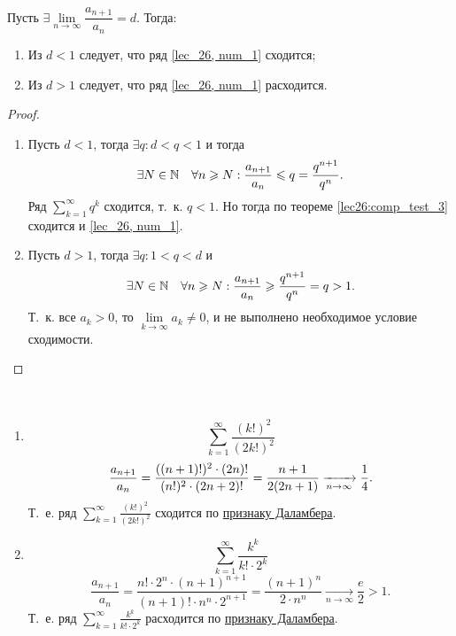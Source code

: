 \documentclass[../../main.tex]{subfiles}
\begin{document}
	\begin{thm}\label{lec27:dalamber}
		
		Пусть $\exists \lim\limits_{n \to \infty} \dfrac{a_{n+1}}{a_n} = d$. Тогда:
		\begin{enumerate}[label={\alph*)}]
		\item Из $d < 1$ следует, что ряд \eqref{lec_26, num_1} сходится;
		\item Из $d > 1$ следует, что ряд \eqref{lec_26, num_1} расходится.
		\end{enumerate}
	\end{thm}
		\begin{proof}
			
			~
			
			\begin{enumerate}[label={\alph*)}]
			\item Пусть $d < 1$, тогда $\exists q : d < q < 1$  и тогда \[\exists N \in 
			\mathbb{N} \quad
			\forall n \geqslant N:
			\frac{a_{n+1}}{a_n} \leqslant q = \frac{q^{n+1}}{q^n}.  \]
			Ряд $\sum\limits_{k=1}^{\infty} q^k$ сходится, т.~к. 
			$q<1$. Но тогда по теореме \ref{lec26:comp_test_3} сходится и 
			\eqref{lec_26, num_1}.
			\item Пусть $d > 1$, тогда $\exists q : 1 < q < d $ и \[\exists N \in \mathbb{N} 
			\quad \forall n 
			\geqslant N:
			\frac{a_{n+1}}{a_n} \geqslant \frac{q^{n+1}}{q^n} = q > 1.  \]
			Т.~к. все $a_k > 0$, то $\lim\limits_{k \to \infty} a_k \neq 0$, и не 
			выполнено необходимое условие сходимости.
			\qedhere
			\end{enumerate}
		\end{proof}
	\begin{examples}

	~

	\begin{enumerate}
	 \item
		\[ \sum_{k = 1}^{\infty} \frac{(k!)^2}{(2k!)^2}    \]
		\[ \frac{a_{n+1}}{a_n} = \frac{((n+1)!)^2 \cdot (2n)!}{(n!)^2 \cdot (2n+2)!} 
		= 
		\frac{n+1}{2(2n+1)}  \xrightarrow[n \rightarrow \infty]{} \frac{1}{4}. \]
		Т.~е. ряд $\sum\limits_{k = 1}^{\infty} \frac{(k!)^2}{(2k!)^2}$ сходится по 
		\hyperref[lec27:dalamber]{признаку Даламбера}.
	\item
		\[  \sum_{k = 1}^{\infty} \frac{k^k}{k! \cdot 2^k} \]
		\[ \frac{a_{n+1}}{a_n} = \frac{n! \cdot 2^n \cdot (n+1)^{n+1}}{(n+1)! \cdot 
		n^n \cdot 
		2^{n+1}} = \frac{(n+1)^{n}}{2\cdot n^n } \underset{n \rightarrow \infty} 
		{\longrightarrow}  \frac{e}{2} > 1. \]
		Т.~е. ряд $\sum\limits_{k = 1}^{\infty} \frac{k^k}{k! \cdot 2^k}$ расходится 
		по 
		\hyperref[lec27:dalamber]{признаку Даламбера}.
	\end{enumerate}
	\end{examples}
\end{document}
